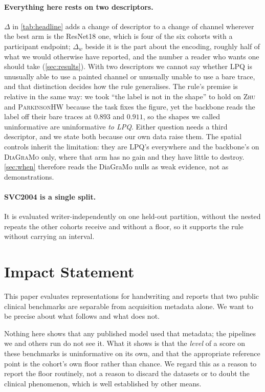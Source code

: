 \documentclass{article}
\begin{document}
\paragraph{Everything here rests on two descriptors.} $\Delta$ in \cref{tab:headline} adds a change
of descriptor to a change of channel wherever the best arm is the ResNet18 one, which is four of the
six cohorts with a participant endpoint; $\Delta_w$ beside it is the part about the encoding,
roughly half of what we would otherwise have reported, and the number a reader who wants one should
take (\cref{sec:results}). With two descriptors we cannot say whether LPQ is unusually able to use a
painted channel or unusually unable to use a bare trace, and that distinction decides how the rule
generalises. The rule's premise is relative in the same way: we took ``the label is not in the
shape'' to hold on \textsc{Zhu} and \textsc{ParkinsonHW} because the task fixes the figure, yet the
backbone reads the label off their bare traces at $0.893$ and $0.911$, so the shapes we called
uninformative are uninformative \emph{to LPQ}. Either question needs a third descriptor, and we
state both because our own data raise them. The spatial controls inherit the limitation: they are
LPQ's everywhere and the backbone's on \textsc{DiaGraMo} only, where that arm has no gain and they
have little to destroy. \cref{sec:when} therefore reads the DiaGraMo nulls as weak evidence,
not as demonstrations.

\paragraph{SVC2004 is a single split.} It is evaluated writer-independently on one held-out
partition, without the nested repeats the other cohorts receive and without a floor, so it supports
the rule without carrying an interval.

\section*{Impact Statement}

This paper evaluates representations for handwriting and reports that two public clinical
benchmarks are separable from acquisition metadata alone. We want to be precise about what
follows and what does not.

Nothing here shows that any published model used that metadata; the pipelines we and others run do
not see it. What it shows is that the \emph{level} of a score on these benchmarks is uninformative
on its own, and that the appropriate reference point is the cohort's own floor rather than chance.
We regard this as a reason to report the floor routinely, not a reason to discard the datasets or
to doubt the clinical phenomenon, which is well established by other means.
\end{document}
